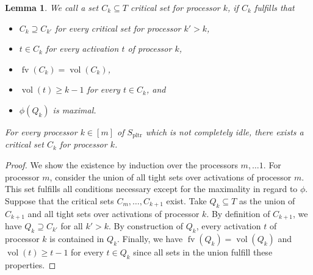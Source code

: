 \documentclass[a4paper]{article}
\DeclareMathOperator{\pltr}{pltr}
\DeclareMathOperator{\fv}{fv}
\DeclareMathOperator{\vol}{vol}
\newtheorem{lemma}[theorem]{Lemma}
\begin{document}
\begin{lemma}
  We call a set $C_k \subseteq T$ \emph{critical set for processor $k$}, if $C_k$ fulfills that
  \begin{itemize}
    \item
      $C_k \supseteq C_{k'}$ for every critical set for processor $k' > k$,
    \item
      $t \in C_k$ for every activation $t$ of processor $k$,
    \item
      $\fv(C_k) = \vol(C_k)$,
    \item
      $\vol(t) \geq k - 1$ for every $t \in C_k$, and
    \item
      $\phi(Q_k)$ is maximal.
  \end{itemize}
  For every processor $k \in [m]$ of $S_{\pltr}$ which is not completely idle, there exists a critical set $C_k$ for processor $k$.

\end{lemma}
\begin{proof}
  We show the existence by induction over the processors $m, \ldots 1$.
  For processor $m$, consider the union of all tight sets over activations of processor $m$.
  This set fulfills all conditions necessary except for the maximality in regard to $\phi$.
  Suppose that the critical sets $C_m, \ldots, C_{k+1}$ exist.
  Take $Q_k \subseteq T$ as the union of $C_{k+1}$ and all tight sets over activations of processor $k$.
  By definition of $C_{k+1}$, we have $Q_k \supseteq C_{k'}$ for all $k' > k$.
  By construction of $Q_k$, every activation $t$ of processor $k$ is contained in $Q_k$.
  Finally, we have $\fv(Q_k) = \vol(Q_k)$ and $\vol(t) \geq t-1$ for every $t \in Q_k$ since all sets in the union fulfill these properties.
\end{proof}
\end{document}

